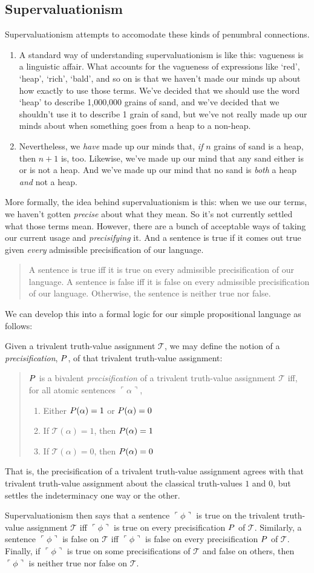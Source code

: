 \documentclass[landscape, two column, full page,reqno]{article}
\let\mathcal\relax
\newcommand{\mathcal}{\OMScal}%
\newcommand{\qd}{\begin{quote}\begin{description}  [align=left,style=nextline,leftmargin=*,labelsep=0pt,font=\normalfont]}
\newcommand{\zd}{\end{description}\end{quote}}
\newcommand{\qe}{\begin{enumerate}[align=left,style=nextline,leftmargin=17pt,labelsep=5pt,font=\normalfont]}
\newcommand{\e}{\emph}
\renewcommand{\P}{\mathcal{P}}
\newcommand{\ze}{\end{enumerate}}
\newcommand{\p}{\item}
\newcommand{\qq}[1]{ \ulcorner #1 \urcorner}
\newcommand{\I}{\mathscr{T}}
\newcommand{\s}{\textsc}
\begin{document}
\subsection{Supervaluationism}
\p Supervaluationism attempts to accomodate these kinds of penumbral connections.
	\qe
	\p A standard way of understanding supervaluationism is like this: vagueness is a linguistic affair.  What accounts for the vagueness of expressions like `red', `heap', `rich', `bald', and so on is that we haven't made our minds up about how exactly to use those terms.  We've decided that we should use the word `heap' to describe 1,000,000 grains of sand, and we've decided that we shouldn't use it to describe  1 grain of sand, but we've not really made up our minds about when something goes from a heap to a non-heap.
	\p Nevertheless, we \e{have} made up our minds that, \e{if} $n$ grains of sand is a heap, then $n+1$ is, too.  Likewise, we've made up our mind that any sand either is or is not a heap.  And we've made up our mind that no sand is \e{both} a heap \e{and} not a heap.
	\ze 
\p More formally, the idea behind supervaluationism is this: when we use our terms, we haven't gotten \e{precise} about what they mean.  So it's not currently settled what those terms mean.  However, there are a bunch of acceptable ways of taking our current usage and \e{precisifying} it.  And a sentence is true if it comes out true given \e{every} admissible precisification of our language.
	\qd
	\p[\s{Supervaluationism}]  A sentence is true iff it is true on every admissible precisification of our language.  A sentence is false iff it is false on every admissible precisification of our language.  Otherwise, the sentence is neither true nor false.  
	\zd 
\p We can develop this into a formal logic for our simple propositional language as follows:
	\qe
	\p Given a trivalent truth-value assignment $\I$, we may define the notion of a \e{precisification}, $\P$, of that trivalent truth-value assignment:
	\qd	\p[\s{Precisification}] $\P$ is a bivalent \e{precisification} of a trivalent truth-value assignment $\I$ iff, for all atomic sentences $\qq{\alpha}$,
		\qe
		\p Either $\P(\alpha) = 1$ or $\P(\alpha) = 0$
		\p If $\I({\alpha}) = 1$, then $\P({\alpha }) = 1$
		\p If $\I({\alpha}) = 0$, then  $\P({\alpha}) = 0$
		\ze
	\zd
	\p That is, the precisification of a trivalent truth-value assignment agrees with that trivalent truth-value assignment about the classical truth-values $1$ and $0$, but settles the indeterminacy one way or the other.
	\ze 
\p Supervaluationism then says that a sentence $\qq{\phi}$ is true on the trivalent truth-value assignment $\I$ iff $\qq{\phi}$ is true on every precisification $\P$ of $\I$.  Similarly, a sentence $\qq{\phi}$ is false on $\I$ iff $\qq{\phi}$ is false on every precisification $\P$ of $\I$.  Finally, if $\qq{\phi}$ is true on some precisifications of $\I$ and false on others, then $\qq{\phi}$ is neither true nor false on $\I$.
\end{document}
